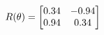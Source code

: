 \documentclass[preview]{standalone}
\begin{document}
\begin{align*}
\special{dvisvgm:raw <g id='unique000'>}R(\theta) = \begin{bmatrix}0.34 & -0.94\\0.94 & 0.34\end{bmatrix}\special{dvisvgm:raw </g>}
\end{align*}
\end{document}
